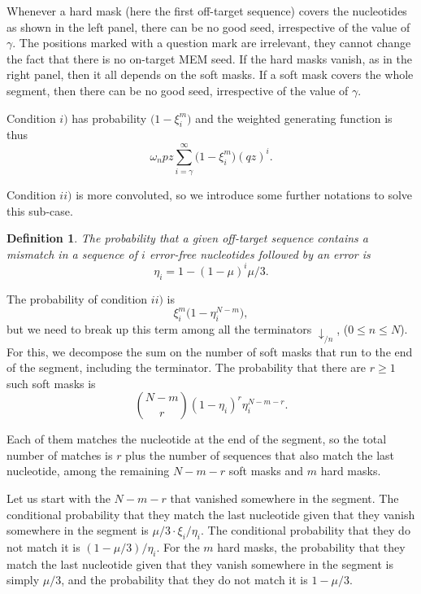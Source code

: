 \documentclass{article}
\newtheorem{definition}{Definition}
\begin{document}
Whenever a hard mask (here the first off-target sequence) covers the
nucleotides as shown in the left panel, there can be no good seed,
irrespective of the value of $\gamma$. The positions marked with a
question mark are irrelevant, they cannot change the fact that there is no
on-target MEM seed. If the hard masks vanish, as in the right panel, then
it all depends on the soft masks. If a soft mask covers the whole segment,
then there can be no good seed, irrespective of the value of $\gamma$.

Condition $i)$ has probability $\big(1 - \xi_i^m \big)$ and the
weighted generating function is thus
\begin{equation*}
\omega_n pz \sum_{i=\gamma}^\infty \Big(1 - \xi_i^m \Big) (qz)^i.
\end{equation*}

Condition $ii)$ is more convoluted, so we introduce some further
notations to solve this sub-case.
\begin{definition}
The probability that a given off-target sequence contains a mismatch in a
sequence of $i$ error-free nucleotides followed by an error is
\begin{equation}
\label{eq:eta}
\eta_i = 1-(1-\mu)^i\mu/3.
\end{equation}
\end{definition}

The probability of condition $ii)$ is
\begin{equation*}
\xi_i^m \Big(1 - \eta_i^{N-m} \Big),
\end{equation*}
but we need to break up this term among all the terminators
$\downarrow_{/n}$, ($0 \leq n \leq N$). For this, we decompose the sum on
the number of soft masks that run to the end of the segment, including the
terminator. The probability that there are $r \geq 1$ such soft masks is
\begin{equation*}
{N-m \choose r} (1 - \eta_i)^r \eta_i^{N-m-r}.
\end{equation*}

Each of them matches the nucleotide at the end of the segment, so the
total number of matches is $r$ plus the number of sequences that also
match the last nucleotide, among the remaining $N-m-r$ soft masks and $m$
hard masks.

Let us start with the $N-m-r$ that vanished somewhere in the segment. The
conditional probability that they match the last nucleotide given that
they vanish somewhere in the segment is $\mu/3 \cdot \xi_i / \eta_i$. The
conditional probability that they do not match it is $(1-\mu/3) / \eta_i$.
For the $m$ hard masks, the probability that they match the last
nucleotide given that they vanish somewhere in the segment is simply
$\mu/3$, and the probability that they do not match it is $1-\mu/3$.
\end{document}
